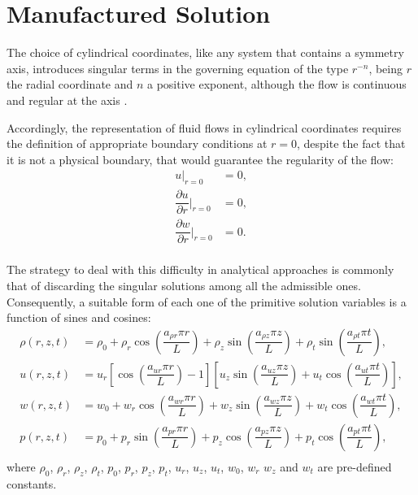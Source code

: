 \documentclass[10pt]{article}
\newcommand{\diff}[2] {\dfrac{\partial #1}{\partial #2}}
\begin{document}
\section{Manufactured Solution}

The choice of cylindrical coordinates, like any system that contains a symmetry axis, introduces singular terms in the governing equation of the type $r^{-n}$, being $r$ the radial coordinate and $n$ a positive exponent, %
 although the flow is continuous and regular at the axis \cite{Domenichini2004}.


Accordingly, the representation of fluid flows in cylindrical coordinates requires the definition of appropriate boundary conditions at $r=0$, despite the fact that it is not a physical boundary, that would guarantee the regularity of the flow: %
\begin{equation}
\label{cc}
\begin{split}
u \big| _{r=0} &=0,\\
 \diff{u}{r}\Big| _{r=0} &=0,\\
\diff{w}{r}\Big| _{r=0} &=0.\\
\end{split}
\end{equation}

The strategy to deal with this difficulty in analytical approaches is commonly that of discarding the singular solutions among all the admissible ones. %
Consequently, a suitable form of each one of the primitive solution variables is a function of sines and cosines:
\begin{equation}
 \label{eq:manufactured01}
\begin{split}
\rho(r,z,t)&= \rho_0+\rho_r \cos\left(\dfrac{a_{\rho r} \pi r}{L}\right)+\rho_z \sin\left(\dfrac{a_{\rho z} \pi z}{L}\right)+\rho_t \sin\left(\dfrac{a_{\rho t} \pi t}{L}\right),\\
u(r,z,t)&= u_r  \left[\cos\left(\dfrac{a_{ur} \pi r}{L}\right)-1 \right] \left[u_z \sin\left(\dfrac{a_{uz} \pi z}{L}\right) + u_t\cos\left(\dfrac{a_{ut} \pi t}{L}\right) \right],\\
w(r,z,t)&=w_0+w_r \cos\left(\dfrac{a_{w r} \pi r}{L}\right)+w_z \sin\left(\dfrac{a_{w z} \pi z}{L}\right)+w_t \cos\left(\dfrac{a_{w t} \pi t}{L}\right),\\
p(r,z,t)&=p_0+p_r \sin\left(\dfrac{a_{p r} \pi r}{L}\right)+p_z \cos\left(\dfrac{a_{p z} \pi z}{L}\right)+p_t \cos\left(\dfrac{a_{p t} \pi t}{L}\right),\\
\end{split}
\end{equation}
%
where $\rho_0$, $\rho_r$,  $\rho_z$,  $\rho_t$, $p_0$, $p_r$, $p_z$, $p_t$, $u_r$, $u_z$, $u_t$, $w_0$, $w_r$ $w_z$ and $w_t$ are pre-defined constants.
\end{document}
